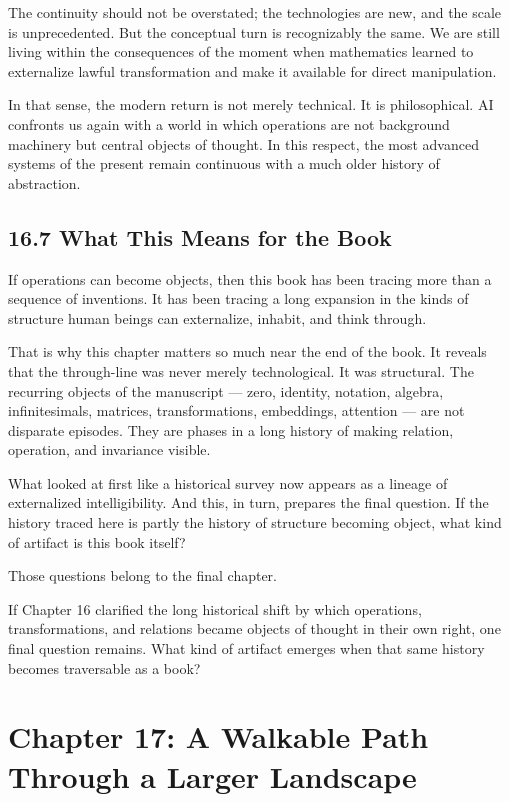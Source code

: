 The continuity should not be overstated; the technologies are new, and
the scale is unprecedented. But the conceptual turn is recognizably the
same. We are still living within the consequences of the moment when
mathematics learned to externalize lawful transformation and make it
available for direct manipulation.

In that sense, the modern return is not merely technical. It is
philosophical. AI confronts us again with a world in which operations
are not background machinery but central objects of thought. In this
respect, the most advanced systems of the present remain continuous with
a much older history of abstraction.

\hypertarget{what-this-means-for-the-book}{%
\subsection{16.7 What This Means for the
Book}\label{what-this-means-for-the-book}}

If operations can become objects, then this book has been tracing more
than a sequence of inventions. It has been tracing a long expansion in
the kinds of structure human beings can externalize, inhabit, and think
through.

That is why this chapter matters so much near the end of the book. It
reveals that the through-line was never merely technological. It was
structural. The recurring objects of the manuscript --- zero, identity,
notation, algebra, infinitesimals, matrices, transformations,
embeddings, attention --- are not disparate episodes. They are phases in
a long history of making relation, operation, and invariance visible.

What looked at first like a historical survey now appears as a lineage
of externalized intelligibility. And this, in turn, prepares the final
question. If the history traced here is partly the history of structure
becoming object, what kind of artifact is this book itself?

Those questions belong to the final chapter.

If Chapter 16 clarified the long historical shift by which operations,
transformations, and relations became objects of thought in their own
right, one final question remains. What kind of artifact emerges when
that same history becomes traversable as a book?

\newpage
\vspace*{3cm}

\hypertarget{chapter-17-a-walkable-path-through-a-larger-landscape}{%
\section{Chapter 17: A Walkable Path Through a Larger
Landscape}\label{chapter-17-a-walkable-path-through-a-larger-landscape}}

